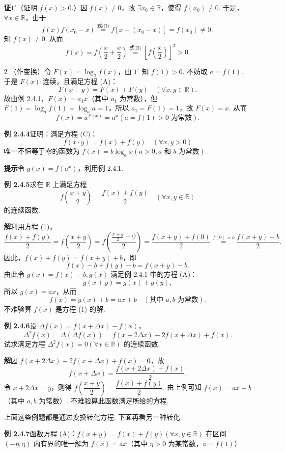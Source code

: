 \documentclass[UTF8,12pt,a4paper,fontset=fandol]{ctexart}
\begin{document}
\noindent\textbf{证}\quad $1^\circ$（证明 $f(x)>0$.）因 $f(x)\ne0$，故 $\exists x_0\in\mathbb{R}$，使得 $f(x_0)\ne0$. 于是，$\forall x\in\mathbb{R}$，由于
\[
  f(x)f(x_0-x)\overset{\text{式(B)}}{=}f[x+(x_0-x)]=f(x_0)\ne0,
\]
知 $f(x)\ne0$. 从而
\[
  f(x)=f\left(\frac x2+\frac x2\right)\overset{\text{式(B)}}{=}\left[f\left(\frac x2\right)\right]^2>0.
\]

$2^\circ$（作变换）令 $F(x)=\log_a f(x)$，由 $1^\circ$ 知 $f(1)>0$. 不妨取 $a=f(1)$. 于是 $F(x)$ 连续，且满足方程 (A)：
\[
  F(x+y)=F(x)+F(y)\quad(\forall x,y\in\mathbb{R}).
\]
故由例 2.4.1，$F(x)=a_1x$（其中 $a_1$ 为常数），但 $F(1)=\log_a f(1)=\log_a a=1$，所以 $a_1=F(1)=1$，故 $F(x)=x$. 从而
\[
  f(x)=a^{F(x)}=a^x(a=f(1)>0\text{ 为常数}).
\]

\noindent\textbf{例 2.4.4}\quad 证明：满足方程 (C)：
\[
  f(x\cdot y)=f(x)+f(y)\quad(\forall x,y>0)
\]
唯一不恒等于零的函数为 $f(x)=b\log_a x(a>0,a\text{ 和 }b\text{ 为常数})$.

\noindent\textbf{提示}\quad 令 $g(x)=f(a^x)$，利用例 2.4.1.

\noindent\textbf{例 2.4.5}\quad 求在 $\mathbb{R}$ 上满足方程
\[
  f\left(\frac{x+y}{2}\right)=\frac{f(x)+f(y)}2\quad(\forall x,y\in\mathbb{R}) \tag{1}
\]
的连续函数.

\noindent\textbf{解}\quad 利用方程 (1)，
\[
  \frac{f(x)+f(y)}2
  =f\left(\frac{x+y}{2}\right)
  =f\left(\frac{\frac{x+y}{2}+0}{2}\right)
  =\frac{f(x+y)+f(0)}2
  \overset{f(0)=b}{=}\frac{f(x+y)+b}2.
\]
因此，$f(x)+f(y)=f(x+y)+b$，即
\[
  f(x)-b+f(y)-b=f(x+y)-b.
\]
由此令 $g(x)=f(x)-b,g(x)$ 满足例 2.4.1 中的方程 (A)：
\[
  g(x+y)=g(x)+g(y),
\]
所以 $g(x)=ax$，从而
\[
  f(x)=g(x)+b=ax+b\quad(\text{其中 }a,b\text{ 为常数}).
\]
不难验算 $f(x)$ 是方程 (1) 的解.

\noindent\textbf{例 2.4.6}\quad 设 $\Delta f(x)=f(x+\Delta x)-f(x)$，
\[
  \Delta^2f(x)=\Delta(\Delta f(x))=f(x+2\Delta x)-2f(x+\Delta x)+f(x).
\]
试求满足方程 $\Delta^2f(x)=0(\forall x\in\mathbb{R})$ 的连续函数.

\noindent\textbf{解}\quad 因 $f(x+2\Delta x)-2f(x+\Delta x)+f(x)=0$，故
\[
  f(x+\Delta x)=\frac{f(x+2\Delta x)+f(x)}2.
\]
令 $x+2\Delta x=y$，则得 $f\left(\dfrac{x+y}{2}\right)=\dfrac{f(x)+f(y)}2$. 由上例可知 $f(x)=ax+b$（其中 $a,b$ 为常数）. 不难验算此函数满足所给的方程.

上面这些例题都是通过变换转化方程. 下面再看另一种转化.

\noindent\textbf{例 2.4.7}\quad 函数方程 (A)：$f(x+y)=f(x)+f(y)(\forall x,y\in\mathbb{R})$ 在区间 $(-\eta,\eta)$ 内有界的唯一解为 $f(x)=ax$（其中 $\eta>0$ 为某常数，$a=f(1)$）.
\end{document}
